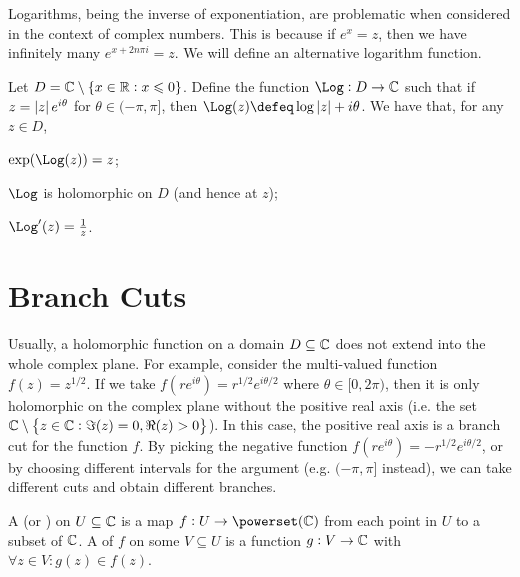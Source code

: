 \documentclass{styles/tufte}
\begin{document}
  Logarithms, being the inverse of exponentiation, are problematic when considered in the context of complex numbers. This is because if $e^x = z$, then we have infinitely many $e^{x + 2n\pi i} = z$. We will define an alternative logarithm function.
  
  \begin{proposition}{}{}
    Let $D = \mathbb{C} \setminus \set{x \in \mathbb{R}: x \leqslant 0}$. Define the function $\Log: D \to \CC$ such that if $z = \abs{z} e^{i\theta}$ for $\theta \in (-\pi, \pi]$, then $\Log(z) \defeq \log\abs{z} + i\theta$. We have that, for any $z \in D$,
    \begin{romanenum}
      \item $\exp(\Log(z)) = z$;
      \item $\Log$ is holomorphic on $D$ (and hence at $z$);
      \item $\Log'(z) = \frac{1}{z}$. 
    \end{romanenum}
  \end{proposition}



\section{Branch Cuts}
  
  Usually, a holomorphic function on a domain $D \subseteq \mathbb{C}$ does not extend into the whole complex plane. For example, consider the multi-valued function $f(z) = z^{1/2}$. If we take $f(re^{i\theta}) = r^{1/2} e^{i\theta/2}$ where $\theta \in [0, 2\pi)$, then it is only holomorphic on the complex plane without the positive real axis (i.e. the set $\mathbb{C} \setminus \set{z \in \mathbb{C}: \Im(z) = 0, \Re(z) > 0}$). In this case, the positive real axis is a branch cut for the function $f$. By picking the negative function $f(re^{i\theta}) = -r^{1/2} e^{i\theta/2}$, or by choosing different intervals for the argument (e.g. $(-\pi, \pi]$ instead), we can take different cuts and obtain different branches.
  
  \begin{definition}{}{}
    A  (or ) on $U \subseteq \mathbb{C}$ is a map $f: U \to \powerset(\CC)$ from each point in $U$ to a subset of $\mathbb{C}$. A  of $f$ on some $V \subseteq U$ is a function $g: V \to \mathbb{C}$ with $\forall z \in V: g(z) \in f(z)$.
  \end{definition}
  
\end{document}
